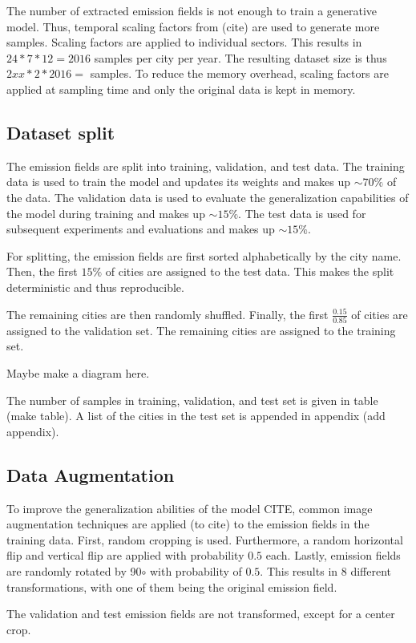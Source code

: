The number of extracted emission fields is not enough to train a generative model.
Thus, temporal scaling factors from (cite) are used to generate more samples.
Scaling factors are applied to individual sectors.
This results in $24 * 7 * 12 = 2016$ samples per city per year.
The resulting dataset size is thus $2xx * 2 * 2016 = $ samples.
To reduce the memory overhead, scaling factors are applied at sampling time and only the original data is kept in memory.

\subsection{Dataset split}
The emission fields are split into training, validation, and test data.
The training data is used to train the model and updates its weights and makes up $\sim  70\%$ of the data.
The validation data is used to evaluate the generalization capabilities of the model during training and makes up $\sim  15\%$.
The test data is used for subsequent experiments and evaluations and makes up $\sim  15\%$.

For splitting, the emission fields are first sorted alphabetically by the city name.
Then, the first $15\%$ of cities are assigned to the test data.
This makes the split deterministic and thus reproducible.

The remaining cities are then randomly shuffled.
Finally, the first $\frac{0.15}{0.85}$ of cities are assigned to the validation set.
The remaining cities are assigned to the training set.

Maybe make a diagram here.

The number of samples in training, validation, and test set is given in table (make table).
A list of the cities in the test set is appended in appendix (add appendix).

\subsection{Data Augmentation}
To improve the generalization abilities of the model CITE, common image augmentation techniques are applied (to cite) to the emission fields in the training data.
First, random cropping is used.
Furthermore, a random horizontal flip and vertical flip are applied with probability $0.5$ each.
Lastly, emission fields are randomly rotated by 90$\circ$ with probability of $0.5$.
This results in $8$ different transformations, with one of them being the original emission field.

The validation and test emission fields are not transformed, except for a center crop.


